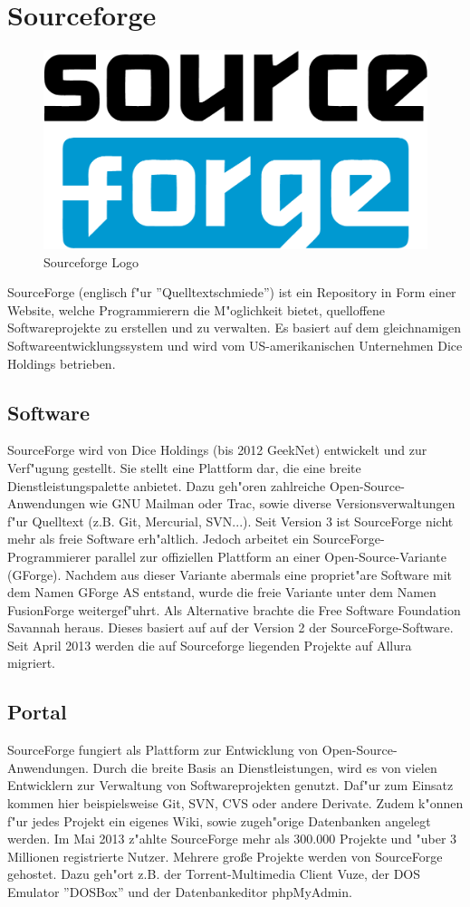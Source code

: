\section{Sourceforge}
\begin{figure}[h]
	\begin{center}
		\includegraphics[width=0.7\linewidth]{fig/sourceforge_logo.png}
		\caption{Sourceforge Logo}
		\label{fig:sourceforge_logo}
	\end{center}
\end{figure}
SourceForge (englisch f"ur ''Quelltextschmiede'') ist ein Repository in Form einer Website,
welche Programmierern die M"oglichkeit bietet, quelloffene Softwareprojekte zu erstellen und zu verwalten. 
Es basiert auf dem gleichnamigen Softwareentwicklungssystem und wird vom US-amerikanischen Unternehmen 
Dice Holdings betrieben.
\subsection{Software}
SourceForge wird von Dice Holdings (bis 2012 GeekNet) entwickelt und zur Verf"ugung gestellt.
Sie stellt eine Plattform dar, die eine breite Dienstleistungspalette anbietet. Dazu geh"oren zahlreiche Open-Source-Anwendungen
wie GNU Mailman oder Trac, sowie diverse Versionsverwaltungen f"ur Quelltext (z.B. Git, Mercurial, SVN...).
Seit Version 3 ist SourceForge nicht mehr als freie Software erh"altlich. Jedoch arbeitet ein SourceForge-Programmierer
parallel zur offiziellen Plattform an einer Open-Source-Variante (GForge). Nachdem aus dieser Variante 
abermals eine propriet"are Software mit dem Namen GForge AS entstand, wurde die freie Variante unter dem Namen FusionForge
weitergef"uhrt. Als Alternative brachte die Free Software Foundation Savannah heraus. Dieses basiert auf
auf der Version 2 der SourceForge-Software.
Seit April 2013 werden die auf Sourceforge liegenden Projekte auf Allura migriert.
\subsection{Portal}
SourceForge fungiert als Plattform zur Entwicklung von Open-Source-Anwendungen. Durch die breite Basis an
Dienstleistungen, wird es von vielen Entwicklern zur Verwaltung von Softwareprojekten genutzt. Daf"ur zum Einsatz kommen
hier beispielsweise Git, SVN, CVS oder andere Derivate. Zudem k"onnen f"ur jedes Projekt
ein eigenes Wiki, sowie zugeh"orige Datenbanken angelegt werden. Im Mai 2013 z"ahlte SourceForge
mehr als 300.000 Projekte und "uber 3 Millionen registrierte Nutzer.
Mehrere große Projekte werden von SourceForge gehostet. Dazu geh"ort z.B. der Torrent-Multimedia Client Vuze,
der DOS Emulator ''DOSBox'' und der Datenbankeditor phpMyAdmin.
